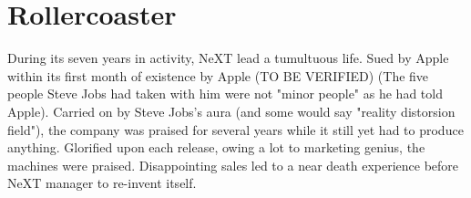 \section{Rollercoaster}
During its seven years in activity, NeXT lead a tumultuous life. Sued by Apple within its first month of existence by Apple (TO BE VERIFIED) (The five people Steve Jobs had taken with him were not "minor people" as he had told Apple). Carried on by Steve Jobs's aura (and some would say "reality distorsion field"), the company was praised for several years while it still yet had to produce anything. Glorified upon each release, owing a lot to marketing genius, the machines were praised. Disappointing sales led to a near death experience before NeXT manager to re-invent itself.\\
\par

